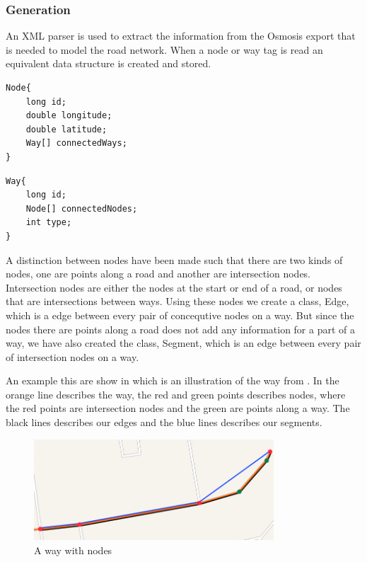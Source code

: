 \subsubsection{Generation}
An XML parser is used to extract the information from the Osmosis export that is needed to model the road network. When a node or way tag is read an equivalent data structure is created and stored.

\begin{lstlisting}[style=java, caption=Datastructure for a node]
Node{
	long id;
	double longitude;
	double latitude;
	Way[] connectedWays;
}
\end{lstlisting}

\begin{lstlisting}[style=java, caption=Datastructure for a way]
Way{
	long id;
	Node[] connectedNodes;
	int type;
}
\end{lstlisting}

A distinction between nodes have been made such that there are two kinds of nodes, one are points along a road and another are intersection nodes. Intersection nodes are either the nodes at the start or end of a road, or nodes that are intersections between ways. Using these nodes we create a class, Edge, which is a edge between every pair of concequtive nodes on a way. But since the nodes there are points along a road does not add any information for a part of a way, we have also created the class, Segment, which is an edge between every pair of intersection nodes on a way. 

An example this are show in  which is an illustration of the way from . In  the orange line describes the way, the red and green points describes nodes, where the red points are intersection nodes and the green are points along a way. The black lines describes our edges and the blue lines describes our segments.

\begin{figure}[h!]
  \centering
    \includegraphics[width=0.8\textwidth]{figures/way-w-nodes2.png}
    \caption{A way with nodes}
    \label{fig:waywithnodes}
\end{figure}


